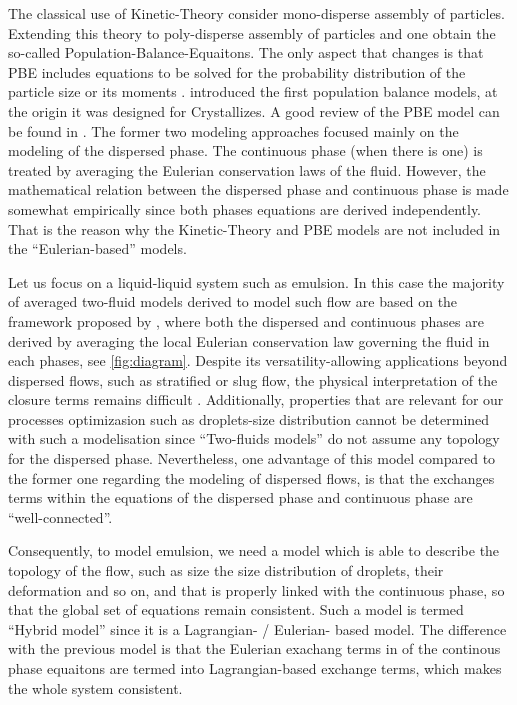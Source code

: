 The classical use of Kinetic-Theory consider mono-disperse assembly of particles. 
Extending this theory to poly-disperse assembly of particles and one obtain the so-called Population-Balance-Equaitons. 
The only aspect that changes is that PBE includes equations to be solved for the probability distribution of the particle size or its moments \citep{fox2023generalized}. 
\citet{randolph2012theory} introduced the first population balance models, at the origin it was designed  for Crystallizes. 
A good review of the PBE model can be found in \citet{marchisio2013computational}. 
The former two modeling approaches focused mainly on the modeling of the dispersed phase.
The continuous phase (when there is one) is treated by averaging the Eulerian conservation laws of the fluid. 
However, the mathematical relation between the dispersed phase and continuous phase is made somewhat empirically since both phases equations are derived independently. 
That is the reason why the Kinetic-Theory and PBE models are not included in the ``Eulerian-based'' models. 

Let us focus on a liquid-liquid system such as emulsion. 
In this case the majority of averaged two-fluid models derived to model such flow are based on the framework proposed by \citet{drew1983mathematical}, where both the dispersed and continuous phases are derived by averaging the local Eulerian conservation law governing the fluid in each phases, see \ref{fig:diagram}.
Despite its versatility-allowing applications beyond dispersed flows, such as stratified or slug flow, the physical interpretation of the closure terms remains difficult \citep{drew1983mathematical}.
Additionally, properties that are relevant for our processes optimizasion such as droplets-size distribution cannot be determined with such a modelisation since ``Two-fluids models'' do not assume any topology for the dispersed phase.
Nevertheless, one advantage of this model compared to the former one regarding the modeling of dispersed flows, is that the exchanges terms within the equations of the dispersed phase and continuous phase are ``well-connected''. 

Consequently, to model emulsion, we need a model  which is able to describe the topology of the flow, such as size the size distribution of droplets, their deformation and so on, and that is properly linked with the continuous phase, so that the global set of equations remain consistent. 
Such a model is termed ``Hybrid model'' since it is a Lagrangian- / Eulerian- based model.
The difference with the previous model is that the Eulerian exachang terms in of the continous phase equaitons are termed into Lagrangian-based exchange terms, which makes the whole system consistent. 

